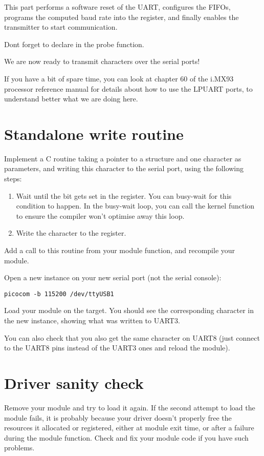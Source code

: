 This part performs a software reset of the UART, configures the FIFOs,
programs the computed baud rate into the register, and finally enables
the transmitter to start communication.

Dont forget to declare  in the probe function.

We are now ready to transmit characters over the serial ports!

If you have a bit of spare time, you can look at chapter 60 of the
i.MX93 processor reference manual for details about how to use the LPUART ports, to understand
better what we are doing here.

\section{Standalone write routine}

Implement a C routine taking a pointer to a 
structure and one character as parameters, and writing
this character to the serial port, using the following steps:

\begin{enumerate}
\item Wait until the  bit gets set in the
   register. You can busy-wait for this condition to happen.
  In the busy-wait loop, you can call the  kernel function
  to ensure the compiler won't optimise away this loop.
\item Write the character to the  register.
\end{enumerate}

Add a call to this routine from your module  function,
and recompile your module.

Open a new  instance on your new serial port (not the
serial console):

\begin{verbatim}
picocom -b 115200 /dev/ttyUSB1
\end{verbatim}

Load your module on the target. You should see the
corresponding character in the new  instance,
showing what was written to UART3.

You can also check that you also get the same character on UART8
(just connect to the UART8 pins instead of the UART3 ones and reload the module).

\section{Driver sanity check}

Remove your module and try to load it again. If the second attempt to
load the module fails, it is probably because your driver doesn't
properly free the resources it allocated or registered, either at module
exit time, or after a failure during the module  function. Check
and fix your module code if you have such problems.
